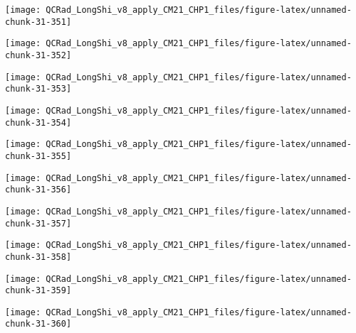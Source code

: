 \documentclass[
  10pt,
  a4paper,oneside]{article}
\begin{document}
\begin{center}\texttt{[image: QCRad\_LongShi\_v8\_apply\_CM21\_CHP1\_files/figure-latex/unnamed-chunk-31-351]} \end{center}

\begin{center}\texttt{[image: QCRad\_LongShi\_v8\_apply\_CM21\_CHP1\_files/figure-latex/unnamed-chunk-31-352]} \end{center}

\begin{center}\texttt{[image: QCRad\_LongShi\_v8\_apply\_CM21\_CHP1\_files/figure-latex/unnamed-chunk-31-353]} \end{center}

\begin{center}\texttt{[image: QCRad\_LongShi\_v8\_apply\_CM21\_CHP1\_files/figure-latex/unnamed-chunk-31-354]} \end{center}

\begin{center}\texttt{[image: QCRad\_LongShi\_v8\_apply\_CM21\_CHP1\_files/figure-latex/unnamed-chunk-31-355]} \end{center}

\begin{center}\texttt{[image: QCRad\_LongShi\_v8\_apply\_CM21\_CHP1\_files/figure-latex/unnamed-chunk-31-356]} \end{center}

\begin{center}\texttt{[image: QCRad\_LongShi\_v8\_apply\_CM21\_CHP1\_files/figure-latex/unnamed-chunk-31-357]} \end{center}

\begin{center}\texttt{[image: QCRad\_LongShi\_v8\_apply\_CM21\_CHP1\_files/figure-latex/unnamed-chunk-31-358]} \end{center}

\begin{center}\texttt{[image: QCRad\_LongShi\_v8\_apply\_CM21\_CHP1\_files/figure-latex/unnamed-chunk-31-359]} \end{center}

\begin{center}\texttt{[image: QCRad\_LongShi\_v8\_apply\_CM21\_CHP1\_files/figure-latex/unnamed-chunk-31-360]} \end{center}
\end{document}
